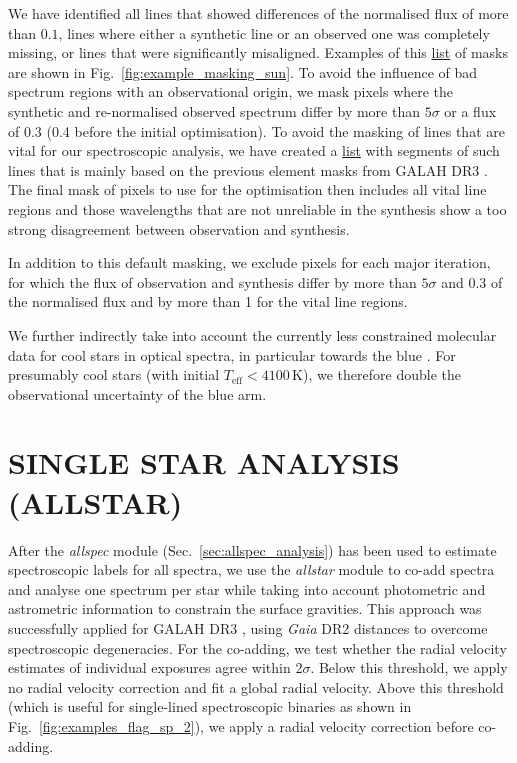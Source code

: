 \documentclass[
  journal=pasa,
  manuscript=research-paper, %
  year=2023,
  volume=37
]{cup-journal}
\newcommand{\Gaia}{\textit{Gaia}\xspace}
\begin{document}
We have identified all lines that showed differences of the normalised flux of more than $0.1$, lines where either a synthetic line or an observed one was completely missing, or lines that were significantly misaligned. Examples of this \href{https://github.com/svenbuder/GALAH_DR4/blob/main/spectrum_analysis/spectrum_masks/solar_spectrum_mask.fits}{list} of masks are shown in Fig.~\ref{fig:example_masking_sun}. To avoid the influence of bad spectrum regions with an observational origin, we mask pixels where the synthetic and re-normalised observed spectrum differ by more than $5\sigma$ or a flux of 0.3 (0.4 before the initial optimisation). To avoid the masking of lines that are vital for our spectroscopic analysis, we have created a \href{https://github.com/svenbuder/GALAH_DR4/blob/main/spectrum_analysis/spectrum_masks/vital_lines.fits}{list} with segments of such lines that is mainly based on the previous element masks from GALAH DR3 \citep{Buder2021}. The final mask of pixels to use for the optimisation then includes all vital line regions and those wavelengths that are not unreliable in the synthesis show a too strong disagreement between observation and synthesis.

In addition to this default masking, we exclude pixels for each major iteration, for which the flux of observation and synthesis differ by more than $5 \sigma$ and 0.3 of the normalised flux and by more than 1 for the vital line regions.

We further indirectly take into account the currently less constrained molecular data for cool stars in optical spectra, in particular towards the blue \citep[e.g.][]{Rains2021}. For presumably cool stars (with initial $T_\text{eff} < 4100\,\mathrm{K}$), we therefore double the observational uncertainty of the blue arm.

\section{SINGLE STAR ANALYSIS (ALLSTAR)}
\label{sec:allstar_analysis}

After the \textit{allspec} module (Sec.~\ref{sec:allspec_analysis}) has been used to estimate spectroscopic labels for all spectra, we use the \textit{allstar} module to co-add spectra and analyse one spectrum per star while taking into account photometric and astrometric information to constrain the surface gravities. This approach was successfully applied for GALAH DR3 \citep{Buder2021}, using \Gaia DR2 distances \citep{BailerJones2018} to overcome spectroscopic degeneracies. For the co-adding, we test whether the radial velocity estimates of individual exposures agree within $2\sigma$. Below this threshold, we apply no radial velocity correction and fit a global radial velocity. Above this threshold (which is useful for single-lined spectroscopic binaries 
as shown in Fig.~\ref{fig:examples_flag_sp_2}), we apply a radial velocity correction before co-adding.
\end{document}
